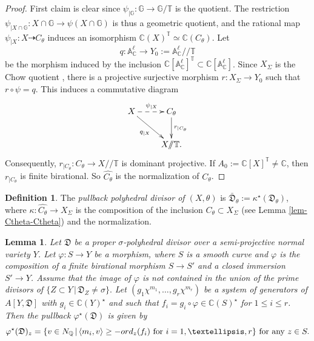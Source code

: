 \documentclass[11pt, reqno]{amsart}
\theoremstyle{plain}
\newtheorem{lemma}[theorem]{Lemma}
\theoremstyle{definition}
\newtheorem{definition}[theorem]{Definition}
\theoremstyle{remark}
\begin{document}
\begin{proof}
First claim is clear since $\psi_{|\mathbb{G}}: \mathbb{G}\rightarrow \mathbb{G}/\mathbb{T}$ is the quotient. The restriction
$\psi_{|X\cap \mathbb{G}}: X\cap \mathbb{G}\rightarrow \psi(X\cap \mathbb{G})$ is thus a geometric quotient, and the rational map $\psi_{|X}: X\dashrightarrow C_{\theta}$  induces an isomorphism
$\mathbb{C}(X)^{\mathbb{T}}\simeq \mathbb{C}(C_{\theta})$. Let 
$$q: \mathbb{A}_{\mathbb{C}}^{\ell}\rightarrow Y_{0}:= \mathbb{A}_{\mathbb{C}}^{\ell}/\!\!/\mathbb{T}$$
be the morphism induced by the inclusion $\mathbb{C}[\mathbb{A}^{\ell}_{\mathbb{C}}]^{\mathbb{T}}\subset \mathbb{C}[\mathbb{A}^{\ell}_{\mathbb{C}}]$. Since $X_{\Sigma}$ is the Chow quotient \cite{KSZ91}, there is a projective surjective morphism $r: X_{\Sigma}\rightarrow Y_{0}$ such that $r\circ \psi =  q$. This induces a commutative diagram 
$$
\xymatrix{
X \ar@{-->}[r]^{\psi_{|X}} \ar[dr]_{q_{|X}} & C_{\theta}\ar[d]^{r_{|C_{\theta}}} \\
 & X/\!\!/\mathbb{T}.
}
$$
Consequently, $r_{|C_{\theta}}: C_{\theta}\rightarrow X/\!\!/\mathbb{T}$ is dominant projective. If $A_{0}:= \mathbb{C}[X]^{\mathbb{T}}\neq \mathbb{C}$, then $r_{|C_{\theta}}$ is finite birational. So $\widehat{C_{\theta}}$ is the normalization of $C_{\theta}$. 
\end{proof}
\begin{definition}\label{def-pullbackpol}
The \emph{pullback polyhedral divisor of $(X, \theta)$} is 
$\bar{\mathfrak{D}}_{\theta}:= \kappa^{\star}(\mathfrak{D}_{\theta})$, where $\kappa: \widehat{C_{\theta}}\rightarrow X_{\Sigma}$ is the composition of the inclusion $C_{\theta}\subset X_{\Sigma}$ (see Lemma \ref{lem-Ctheta-Ctheta}) and the normalization. 
\end{definition}
\begin{lemma}\label{lem-tectec}
Let $\mathfrak{D}$ be a proper $\sigma$-polyhedral divisor over a semi-projective normal variety $Y$. Let $\varphi: S\rightarrow Y$ be a morphism, where $S$ is a smooth curve and $\varphi$ is the composition of a finite 
birational morphism $S\rightarrow S'$ and a closed immersion $S'\rightarrow Y$. Assume that the image of $\varphi$ is not
contained in the union  of the prime divisors of 
$\{Z\subset Y\,|\, \mathfrak{D}_{Z}\neq \sigma\}.$
Let $(g_{1}\chi^{m_{1}}, \ldots, g_{r}\chi^{m_{r}})$ be a system of generators of 
$A[Y, \mathfrak{D}]$ with $g_{i}\in\mathbb{C}(Y)^{\star}$
and such that $f_{i}  =  g_{i}\circ \varphi \in\mathbb{C}(S)^{\star}$  for $1\leq i\leq r$. 
Then the pullback  $\varphi^{\star}(\mathfrak{D})$ is given by 
$$ \varphi^{\star}(\mathfrak{D})_{z} =  \{v\in N_{\mathbb{Q}}\,|\, \langle m_{i}, v\rangle \geq -{\rm ord}_{z}(f_{i})\text{ for }i=1, \ldots, r\} \text{ for any } z\in S.$$ 
\end{lemma}
\end{document}
